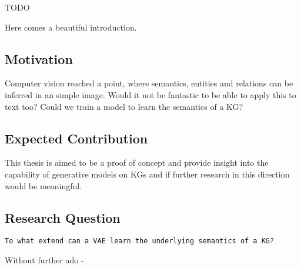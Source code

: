 
TODO

Here comes a beautiful introduction. %


\subsection{Motivation}

Computer vision reached a point, where semantics, entities and relations can be inferred in an simple image.
Would it not be fantastic to be able to apply this to text too?
Could we train a model to learn the semantics of a KG?

\subsection{Expected Contribution}

This thesis is aimed to be a proof of concept and provide insight into the capability of generative models on KGs and if further research in this direction would be meaningful.

\subsection{Research Question}

\texttt{To what extend can a VAE learn the underlying semantics of a KG?}


Without further ado -
